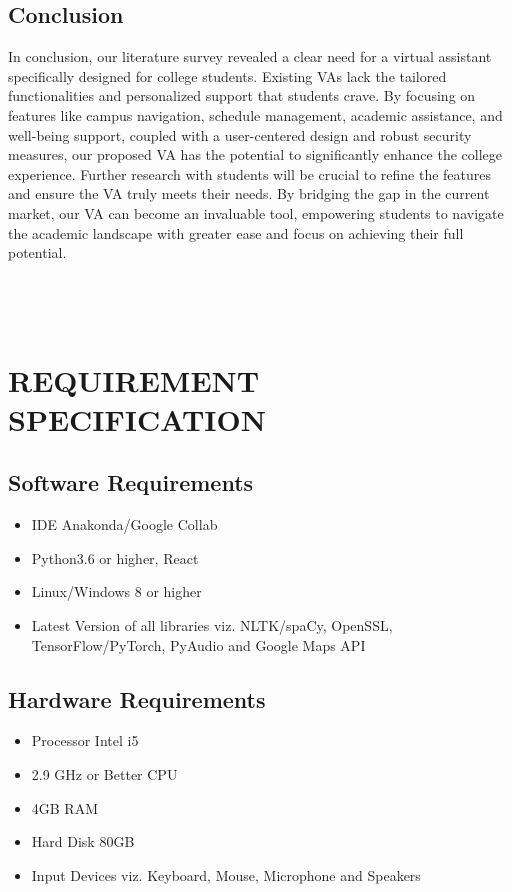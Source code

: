 \documentclass[12pt,a4paper]{report}
\begin{document}
\section{Conclusion}
In conclusion, our literature survey revealed a clear need for a virtual assistant specifically designed for college students. Existing VAs lack the tailored functionalities and personalized support that students crave. By focusing on features like campus navigation, schedule management, academic assistance, and well-being support, coupled with a user-centered design and robust security measures, our proposed VA has the potential to significantly enhance the college experience. Further research with students will be crucial to refine the features and ensure the VA truly meets their needs. By bridging the gap in the current market, our VA can become an invaluable tool, empowering students to navigate the academic landscape with greater ease and focus on achieving their full potential.\\\\\\\\


\newpage
\chapter{REQUIREMENT SPECIFICATION}
\section{Software Requirements}
\begin{itemize}
\item  IDE Anakonda/Google Collab
\item  Python3.6 or higher, React
\item  Linux/Windows 8 or higher
\item Latest Version of all libraries viz. NLTK/spaCy, OpenSSL, TensorFlow/PyTorch, PyAudio and Google Maps API
\end{itemize}
\section{Hardware Requirements}
\begin{itemize}
\item Processor Intel i5 
\item 2.9 GHz or Better CPU 
\item 4GB RAM 
\item  Hard Disk 80GB 
\item Input Devices viz. Keyboard, Mouse, Microphone and Speakers 
\end{itemize}
\end{document}
